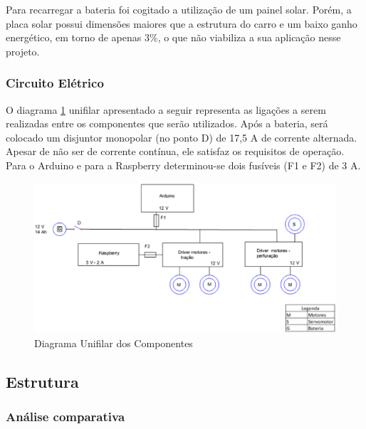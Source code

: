       Para recarregar a bateria foi cogitado a utilização de um painel solar. Porém, a placa solar possui dimensões maiores 
      que a estrutura do carro e um baixo ganho energético, em torno de apenas 3\%, o que não viabiliza a sua aplicação nesse 
      projeto.
      
      \subsubsection{Circuito Elétrico}
      
      O diagrama \ref{diagramaunifilar} unifilar apresentado a seguir representa as ligações a serem realizadas entre os componentes que serão utilizados. 
      Após a bateria, será colocado um disjuntor monopolar (no ponto D) de 17,5 A de corrente alternada. Apesar de não ser de 
      corrente contínua, ele satisfaz os requisitos de operação. Para o Arduino e para a Raspberry determinou-se dois fusíveis 
      (F1 e F2) de 3 A.
      
      \begin{figure}[!htbp]
	\centering
	\label{diagramaunifilar}
	  \includegraphics[keepaspectratio=true,scale=0.6]{figuras/diagramaunifilar.eps}
	\caption{Diagrama Unifilar dos Componentes}
      \end{figure}
      
  \subsection{Estrutura}
  
  \subsubsection{Análise comparativa}
  
  
  
